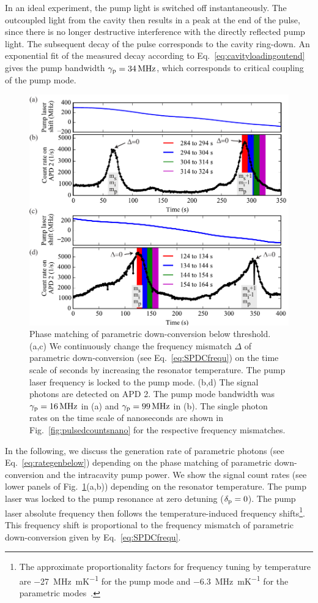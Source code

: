 \documentclass[aps,pra,showpacs,reprint,onecolumn,notitlepage]{revtex4-1}
\newcommand{\tx}[1]{\textnormal{#1}}
\begin{document}
In an ideal experiment, the pump light is switched off instantaneously. The outcoupled light from the cavity then results in a peak at the end of the pulse, since there is no longer destructive interference with the directly reflected pump light. The subsequent decay of the pulse corresponds to the cavity ring-down. An exponential fit of the measured decay according to Eq.~\ref{eq:cavityloadingoutend} gives the pump bandwidth $\gamma_\tx{p}=\SI{34}{\MHz}$, which corresponds to critical coupling of the pump mode.
\begin{figure}[htb]
  \centering
  \includegraphics[scale=0.8]{pictures/exp_WGMR_detuning/SPDC_detuning_tempshift_1.pdf} 
\caption{Phase matching of parametric down-conversion below threshold. (a,c) We continuously change the frequency mismatch $\Delta$ of parametric down-conversion (see Eq.~\ref{eq:SPDCfrequ}) on the time scale of seconds by increasing the resonator temperature. The pump laser frequency is locked to the pump mode. (b,d) The signal photons are detected on APD 2. The pump mode bandwidth was $\gamma_\tx{p}=\SI{16}{\MHz}$ in (a) and $\gamma_\tx{p}=\SI{99}{\MHz}$ in (b). The single photon rates on the time scale of nanoseconds are shown in Fig.~\ref{fig:pulsedcountsnano} for the respective frequency mismatches.}
	\label{fig:pulsedcounts}
\end{figure}

In the following, we discuss the generation rate of parametric photons (see Eq.~\ref{eq:rategenbelow}) depending on the phase matching of parametric down-conversion and the intracavity pump power. We show the signal count rates (see lower panels of Fig.~\ref{fig:pulsedcounts}(a,b)) depending on the resonator temperature. The pump laser was locked to the pump resonance at zero detuning ($\delta_\tx{p}=0$). The pump laser absolute frequency then follows the temperature-induced frequency shifts\footnote{The approximate proportionality factors for frequency tuning by temperature are \SI{-27}{\MHz\per\milli\kelvin} for the pump mode and \SI{-6.3}{\MHz\per\milli\kelvin} for the parametric modes~\cite{Schlarb1994,Weis1985}.}. This frequency shift is proportional to the frequency mismatch of parametric down-conversion given by Eq.~\ref{eq:SPDCfrequ}. 
\end{document}
